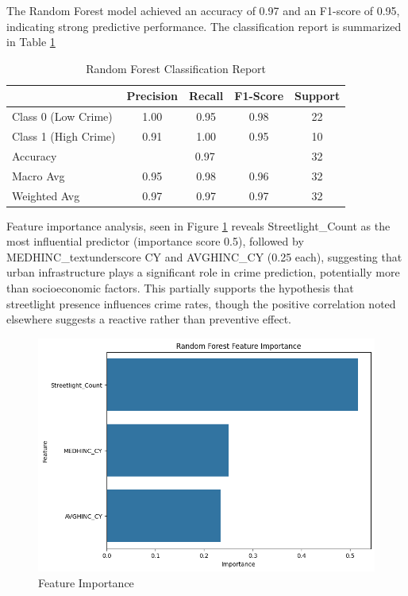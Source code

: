 \documentclass{report}
\begin{document}
\par The Random Forest model achieved an accuracy of 0.97 and an F1-score of 0.95, indicating strong predictive performance. The classification report is summarized in Table \ref{tab:rf_classification_report}

\begin{table}[htbp]
  \centering
  \caption{Random Forest Classification Report}
  \label{tab:rf_classification_report}
  \begin{tabular}{lcccc}
    \toprule
    & Precision & Recall & F1-Score & Support \\
    \midrule
    Class 0 (Low Crime) & 1.00 & 0.95 & 0.98 & 22 \\
    Class 1 (High Crime) & 0.91 & 1.00 & 0.95 & 10 \\
    \midrule
    Accuracy & \multicolumn{3}{c}{0.97} & 32 \\
    Macro Avg & 0.95 & 0.98 & 0.96 & 32 \\
    Weighted Avg & 0.97 & 0.97 & 0.97 & 32 \\
    \bottomrule
  \end{tabular}
\end{table}

\par Feature importance analysis, seen in Figure \ref{fig:random-forest} reveals Streetlight\_Count as the most influential predictor (importance score 0.5), followed by MEDHINC\_textunderscore CY and AVGHINC\_CY (0.25 each), suggesting that urban infrastructure plays a significant role in crime prediction, potentially more than socioeconomic factors. This partially supports the hypothesis that streetlight presence influences crime rates, though the positive correlation noted elsewhere suggests a reactive rather than preventive effect.

\begin{figure}[htbp]
  \centering
  \includegraphics[width=.6\textwidth]{random-forest.png}
  \caption{Feature Importance}
  \label{fig:random-forest}
\end{figure}
\end{document}

